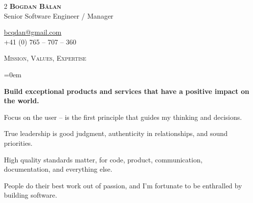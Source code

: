 \documentclass[11pt]{article}
\begin{document}
\pagestyle{empty}
\begin{multicols}{2}
  \noindent 
  \textcolor{Primary}{\textbf {\huge \textsc{Bogdan Bălan}}}\\
  Senior Software Engineer / Manager

  \columnbreak
  \raggedleft
  \href{mailto:bcqdan@gmail.com}{bcqdan@gmail.com}\\
  +41 (0) 765 -- 707 -- 360
\end{multicols}

\vspace{0.12in}
\noindent
\textcolor{Primary}{{\large \textsc{Mission, Values, Expertise}}}

\begin{list}{}{\leftmargin=0em}
  \setlength{\itemsep}{1pt}
  \setlength{\parskip}{0pt}
  \setlength{\parsep}{0pt}

\item
{\bf Build exceptional products and services that have a positive impact on the world.}
\item
Focus on the user -- is the first principle that guides my thinking and decisions.
\item
True leadership is good judgment, authenticity in relationships, and sound priorities.
\item
High quality standards matter, for code, product, communication, documentation, and everything else.
\item
People do their best work out of passion, and I'm fortunate to be enthralled by building software.

\end{list}
\end{document}
